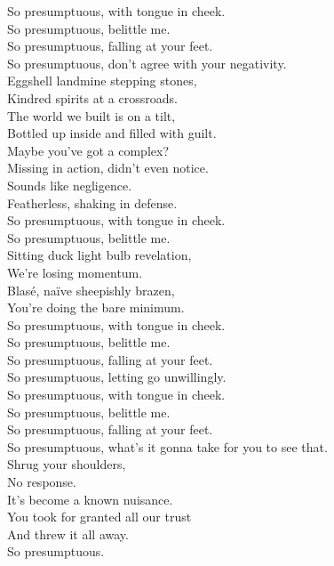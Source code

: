 


So presumptuous, with tongue in cheek. \\
So presumptuous, belittle me. \\
So presumptuous, falling at your feet. \\
So presumptuous, don't agree with your negativity. \\

Eggshell landmine stepping stones, \\
Kindred spirits at a crossroads. \\
The world we built is on a tilt, \\
Bottled up inside and filled with guilt. \\
Maybe you've got a  complex? \\
Missing in action, didn't even notice. \\
Sounds like negligence. \\
Featherless, shaking in defense. \\

So presumptuous, with tongue in cheek. \\
So presumptuous, belittle me. \\

Sitting duck light bulb revelation, \\
We're losing momentum. \\
Blasé, naïve sheepishly brazen, \\
You're doing the bare minimum. \\

So presumptuous, with tongue in cheek. \\
So presumptuous, belittle me. \\
So presumptuous, falling at your feet. \\
So presumptuous, letting go unwillingly. \\

So presumptuous, with tongue in cheek. \\
So presumptuous, belittle me. \\
So presumptuous, falling at your feet. \\
So presumptuous, what's it gonna take for you to see that. \\

Shrug your shoulders, \\
No response. \\
It's become a known nuisance. \\
You took for granted all our trust \\
And threw it all away. \\
So presumptuous. \\

